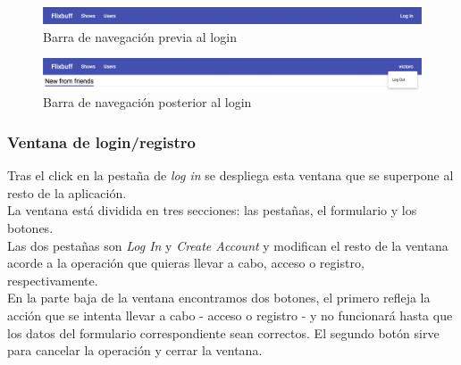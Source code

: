 \begin{figure}[H]
    \centering	
        \includegraphics[scale=0.25]{img/navbar.png}
    \caption{ Barra de navegación previa al login }\label{fig:navbar}
\end{figure}

\begin{figure}[H]
    \centering	
        \includegraphics[scale=0.25]{img/logged-navbar.png}
    \caption{ Barra de navegación posterior al login }\label{fig:logged-navbar}
\end{figure}

\subsubsection{Ventana de login/registro}\label{sec:login-signin}
Tras el click en la pestaña de \textit{log in} se despliega esta ventana que se superpone al resto de la aplicación.\\

La ventana está dividida en tres secciones: las pestañas, el formulario y los botones. \\

Las dos pestañas son \textit{Log In} y \textit{Create Account} y modifican el resto de la ventana acorde a la operación
que quieras llevar a cabo, acceso o registro, respectivamente.\\

En la parte baja de la ventana encontramos dos botones, el primero refleja la acción que se intenta llevar a cabo - 
acceso o registro - y no funcionará hasta que los datos del formulario correspondiente sean correctos. El segundo botón
sirve para cancelar la operación y cerrar la ventana.\\

